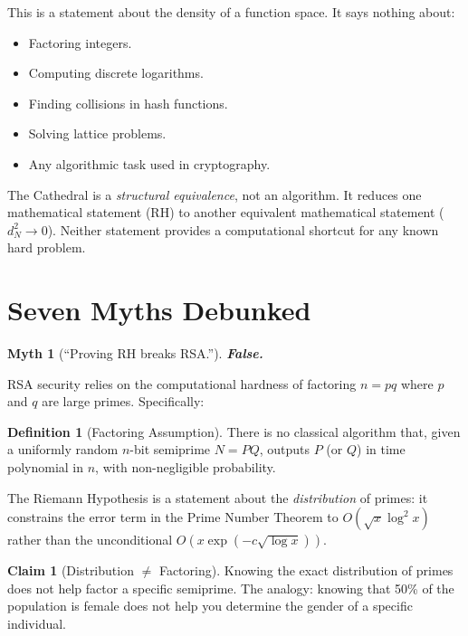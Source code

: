 \documentclass[11pt,a4paper]{article}
\theoremstyle{definition}
\newtheorem{claim}[theorem]{Claim}
\newtheorem{definition}[theorem]{Definition}
\theoremstyle{plain}
\newtheorem{myth}{Myth}
\begin{document}
This is a statement about the density of a function space. It says
nothing about:
\begin{itemize}
  \item Factoring integers.
  \item Computing discrete logarithms.
  \item Finding collisions in hash functions.
  \item Solving lattice problems.
  \item Any algorithmic task used in cryptography.
\end{itemize}

The Cathedral is a \emph{structural equivalence}, not an algorithm.
It reduces one mathematical statement (RH) to another equivalent
mathematical statement ($d_N^2 \to 0$). Neither statement provides
a computational shortcut for any known hard problem.

\section{Seven Myths Debunked}
\label{sec:myths}

\begin{myth}[``Proving RH breaks RSA.'']
\label{myth:rsa}
\textbf{False.}
\end{myth}

RSA security relies on the computational hardness of factoring
$n = pq$ where $p$ and $q$ are large primes. Specifically:

\begin{definition}[Factoring Assumption]
There is no classical algorithm that, given a uniformly random
$n$-bit semiprime $N = PQ$, outputs $P$ (or $Q$) in time
polynomial in $n$, with non-negligible probability.
\end{definition}

The Riemann Hypothesis is a statement about the \emph{distribution}
of primes: it constrains the error term in the Prime Number Theorem
to $O(\sqrt{x}\log^2 x)$ rather than the unconditional
$O(x\exp(-c\sqrt{\log x}))$.

\begin{claim}[Distribution $\neq$ Factoring]
\label{claim:separation}
Knowing the exact distribution of primes does not help factor a
specific semiprime. The analogy: knowing that 50\% of the population
is female does not help you determine the gender of a specific
individual.
\end{claim}
\end{document}
